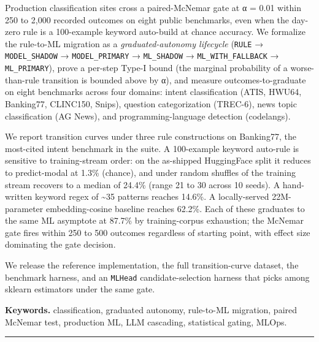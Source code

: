 Production classification sites cross a paired-McNemar gate at α = 0.01
within 250 to 2,000 recorded outcomes on eight public benchmarks, even
when the day-zero rule is a 100-example keyword auto-build at chance
accuracy. We formalize the rule-to-ML migration as a
\emph{graduated-autonomy lifecycle} (\texttt{RULE} →
\texttt{MODEL\_SHADOW} → \texttt{MODEL\_PRIMARY} → \texttt{ML\_SHADOW} →
\texttt{ML\_WITH\_FALLBACK} → \texttt{ML\_PRIMARY}), prove a per-step
Type-I bound (the marginal probability of a worse-than-rule transition
is bounded above by α), and measure outcomes-to-graduate on eight
benchmarks across four domains: intent classification (ATIS, HWU64,
Banking77, CLINC150, Snips), question categorization (TREC-6), news
topic classification (AG News), and programming-language detection
(codelangs).

We report transition curves under three rule constructions on Banking77,
the most-cited intent benchmark in the suite. A 100-example keyword
auto-rule is sensitive to training-stream order: on the as-shipped
HuggingFace split it reduces to predict-modal at 1.3\% (chance), and
under random shuffles of the training stream recovers to a median of
24.4\% (range 21 to 30 across 10 seeds). A hand-written keyword regex of
\textasciitilde35 patterns reaches 14.6\%. A locally-served
22M-parameter embedding-cosine baseline reaches 62.2\%. Each of these
graduates to the same ML asymptote at 87.7\% by training-corpus
exhaustion; the McNemar gate fires within 250 to 500 outcomes regardless
of starting point, with effect size dominating the gate decision.

We release the reference implementation, the full transition-curve
dataset, the benchmark harness, and an \texttt{MLHead}
candidate-selection harness that picks among sklearn estimators under
the same gate.

\textbf{Keywords.} classification, graduated autonomy, rule-to-ML
migration, paired McNemar test, production ML, LLM cascading,
statistical gating, MLOps.

\begin{center}\rule{0.5\linewidth}{0.5pt}\end{center}
